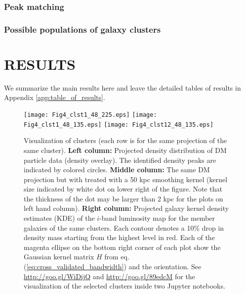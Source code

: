 \subsubsection{Peak matching}

\subsubsection{Possible populations of galaxy clusters}







\section{RESULTS} 
\label{sec:results}

We summarize the main results here and leave the detailed tables of results in 
Appendix \ref{app:table_of_results}.


\begin{figure*}
	\begin{center}
	\texttt{[image: Fig4\_clst1\_48\_225.eps]}
	\texttt{[image: Fig4\_clst1\_48\_135.eps]}
	\texttt{[image: Fig4\_clst12\_48\_135.eps]}
	\caption{ Visualization of clusters (each row is for the same projection
		of the same cluster). {\bf Left column:} Projected density distribution of DM	
		particle data (density overlay). 
		The identified density peaks are indicated by colored circles. 
		{\bf Middle column:} The same DM projection but with treated with a 50 
		kpc smoothing kernel (kernel size indicated by white dot on lower right of
		the figure. Note that the thickness of the dot may be larger than 2 kpc
		for the plots on left hand column).
		{\bf Right column:} Projected galaxy kernel density estimates (KDE) of 
		the $i$-band luminosity map for the member
		galaxies of the same clusters. Each contour denotes a 10\% drop in density
		mass starting from the highest level in red. Each of the magenta ellipse on the
		bottom right corner of each plot show the Gaussian kernel matrix $H$ from  
		eq. (\ref{eq:cross_validated_bandwidth}) and the orientation. 
		See \href{http://goo.gl/WiDijQ}{http://goo.gl/WiDijQ} 
		and \href{http://goo.gl/89edcM}{http://goo.gl/89edcM} for the 
		visualization of the selected clusters inside two Jupyter notebooks.
		\label{fig:select_peak_visualization}
	}
\end{center}
\end{figure*}


